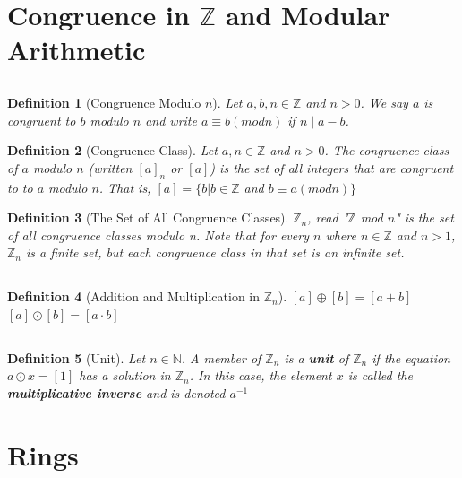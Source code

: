 \documentclass{article}
\theoremstyle{break}
\newtheorem{definition}{Definition}[subsection]
\newcommand*{\Z}{\mathbb{Z}}
\newcommand*{\N}{\mathbb{N}}
\begin{document}
\section{Congruence in $\Z$ and Modular Arithmetic}
\subsection{}
\begin{definition}[Congruence Modulo $n$]
  Let $a, b, n \in \Z$ and $n > 0$. We say $a$ is congruent to $b$ modulo $n$
  and write $a \equiv b (mod n)$ if $n \mid a - b$.
\end{definition}

\begin{definition}[Congruence Class]
  Let $a, n \in \Z$ and $n > 0$. The congruence class of $a$ modulo $n$
  (written $[a]_n$ or $[a]$) is the set of all integers that are congruent to
  to $a$ modulo $n$. That is, $[a] = \{b | b \in \Z$ and $b \equiv a (mod n)\}$
\end{definition}

\begin{definition}[The Set of All Congruence Classes] 
  $\Z_n$, read "$\Z$ mod $n$" is the set of all congruence classes modulo n.
  Note that for every $n$ where $n \in \Z$ and $n > 1$, $\Z_n$ is a finite set,
  but each congruence class in that set is an infinite set. 
\end{definition}

\subsection{}
\begin{definition}[Addition and Multiplication in $\Z_n$]
  $[a] \oplus [b] = [a + b]$
  \\$[a] \odot [b] = [a \cdot b]$
\end{definition}

\subsection{}
\begin{definition}[Unit]
  Let $n \in \N$. A member of $\Z_n$ is a \textbf{unit} of $\Z_n$ if the
  equation $a \odot x = [1]$ has a solution in $\Z_n$. In this case, the
  element $x$ is called the \textbf{multiplicative inverse} and is denoted 
  $a^{-1}$
\end{definition}

\pagebreak
\section{Rings}
\end{document}
